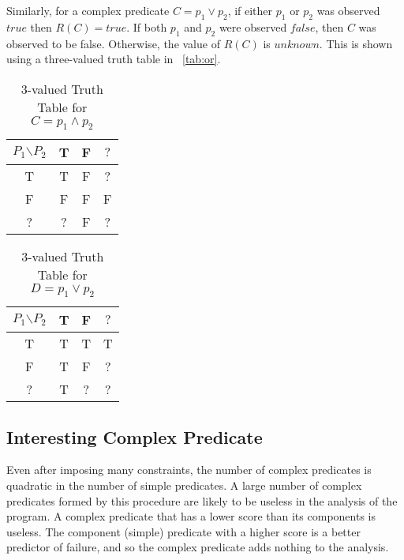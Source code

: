 Similarly, for a complex predicate $C = p_1 \vee p_2$, if either $p_1$ or $p_2$ was observed $true$ then $R(C) = true$.  If both $p_1$ and $p_2$ were observed $false$, then $C$ was observed to be false.  Otherwise, the value of $R(C)$ is $unknown$.  This is shown using a three-valued truth table in ~\autoref{tab:or}.
 
\begin{table*}
\nocaptionrule
\caption{3-valued Truth Table for $C = p_1 \wedge p_2$}
\label{tab:and}
\centering
\scriptsize
  
\begin{tabular}{c|ccc}
  $P_1$$\backslash$$P_2$ & T & F & $?$ \\
  \hline
  T & T & F & ? \\
  F & F & F & F \\
  ? & ? & F & ? \\
\end{tabular}
\end{table*}


\begin{table*}
\nocaptionrule
\caption{3-valued Truth Table for $D = p_1 \vee p_2$}
\label{tab:or}
\centering
\scriptsize
  
  \centering
  \begin{tabular}{c|ccc}
  $P_1$$\backslash$$P_2$ & T & F & $?$ \\
  \hline
  T & T & T & T \\
  F & T & F & ? \\
  ? & T & ? & ? \\
\end{tabular}
\end{table*}

\subsection{Interesting Complex Predicate}

Even after imposing many constraints, the number of complex predicates is quadratic in the number of simple predicates.  A large number of complex predicates formed by this procedure are likely to be useless in the analysis of the program.  A complex predicate that has a lower score than its components is useless.  The component (simple) predicate with a higher score is a better predictor of failure, and so the complex predicate adds nothing to the analysis.

